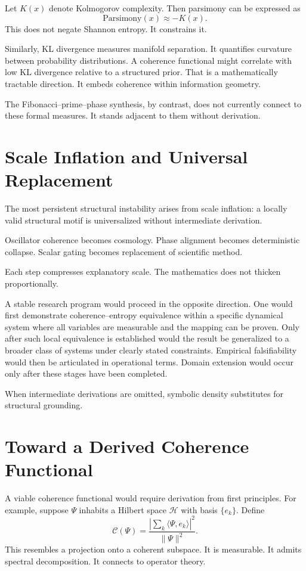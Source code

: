 \documentclass[12pt]{article}
\begin{document}
Let $K(x)$ denote Kolmogorov complexity. Then parsimony can be expressed as
\[
  \text{Parsimony}(x) \approx -K(x).
\]
This does not negate Shannon entropy. It constrains it.

Similarly, KL divergence measures manifold separation. It quantifies curvature between probability distributions. A coherence functional might correlate with low KL divergence relative to a structured prior. That is a mathematically tractable direction. It embeds coherence within information geometry.

The Fibonacci–prime–phase synthesis, by contrast, does not currently connect to these formal measures. It stands adjacent to them without derivation.

\section{Scale Inflation and Universal Replacement}

The most persistent structural instability arises from scale inflation: a locally valid structural motif is universalized without intermediate derivation.

Oscillator coherence becomes cosmology.  
Phase alignment becomes deterministic collapse.  
Scalar gating becomes replacement of scientific method.

Each step compresses explanatory scale. The mathematics does not thicken proportionally.

A stable research program would proceed in the opposite direction. One would first demonstrate coherence–entropy equivalence within a specific dynamical system where all variables are measurable and the mapping can be proven. Only after such local equivalence is established would the result be generalized to a broader class of systems under clearly stated constraints. Empirical falsifiability would then be articulated in operational terms. Domain extension would occur only after these stages have been completed.

When intermediate derivations are omitted, symbolic density substitutes for structural grounding.

\section{Toward a Derived Coherence Functional}

A viable coherence functional would require derivation from first principles. For example, suppose $\Psi$ inhabits a Hilbert space $\mathcal{H}$ with basis $\{e_k\}$. Define
\[
  \mathcal{C}(\Psi) = 
  \frac{\left|\sum_k \langle \Psi, e_k \rangle\right|^2}
       {\|\Psi\|^2}.
\]
This resembles a projection onto a coherent subspace. It is measurable. It admits spectral decomposition. It connects to operator theory.
\end{document}
